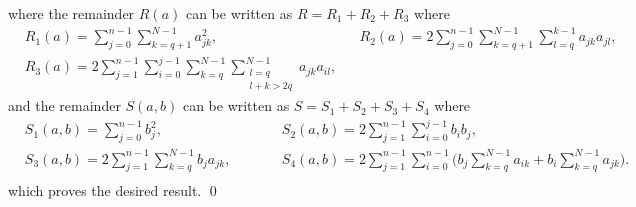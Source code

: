 \documentclass[10pt]{article}
\begin{document}
	where the remainder $R(a)$ can be written as $R = R_1 + R_2 + R_3$ where
	\begin{equation}\label{eq:ApdProofRemainderR}
	\begin{alignedat}{2}
		&R_1(a) = \sum_{j=0}^{n-1}\sum_{k=q+1}^{N-1} a_{jk}^2,	&&R_2(a) = 2 \sum_{j=0}^{n-1}\sum_{k=q+1}^{N-1}\sum_{l=q}^{k-1} a_{jk} a_{jl},\\
		&R_3(a) = 2 \sum_{j=1}^{n-1} \sum_{i=0}^{j-1} \sum_{k=q}^{N-1}\sum_{\substack{l=q \\ l+k > 2q}}^{N-1} a_{jk}a_{il},
	\end{alignedat}
	\end{equation}
	and the remainder $S(a, b)$ can be written as $S = S_1 + S_2 + S_3 + S_4$ where
	\begin{equation}
	\begin{alignedat}{2}
		&S_1(a, b) = \sum_{j=0}^{n-1} b_j^2,  &&S_2(a, b) = 2\sum_{j=1}^{n-1} \sum_{i=0}^{j-1} b_i b_j, \\
		&S_3(a, b) = 2\sum_{j=1}^{n-1} \sum_{k=q}^{N-1} b_j a_{jk}, \qquad &&S_4(a, b) = 2\sum_{j=1}^{n-1}\sum_{i=0}^{n-1}\Big(b_j \sum_{k=q}^{N-1} a_{ik} + b_i \sum_{k=q}^{N-1} a_{jk}\Big).\\
	\end{alignedat}
	\end{equation}
	which proves the desired result. \qed 
\end{document}
